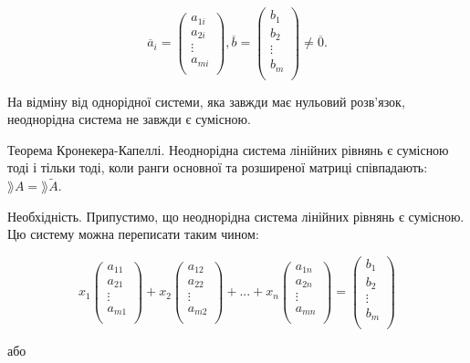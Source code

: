 $$\overline{a}_i = \begin{pmatrix}
	a_{1i} \\
	a_{2i} \\
	\vdots \\
	a_{mi} \\
\end{pmatrix}, \overline{b} = \begin{pmatrix}
	b_{1} \\
	b_{2} \\
	\vdots \\
	b_{m} \\
\end{pmatrix} \neq \overline{0}.$$


На відміну від однорідної системи, яка завжди має нульовий розв’язок,
неоднорідна система не завжди є сумісною.


Теорема Кронекера-Капеллі. Неоднорідна система лінійних рівнянь є
сумісною тоді і тільки тоді, коли ранги основної та розширеної матриці
співпадають: $\rang A = \rang \tilde{A}$.

Необхідність. Припустимо, що неоднорідна система лінійних рівнянь є
сумісною. Цю систему можна переписати таким чином: 

$$x_1 \begin{pmatrix}
	a_{11} \\
	a_{21} \\
	\vdots \\
	a_{m1} \\
\end{pmatrix} + x_2 \begin{pmatrix}
	a_{12} \\
	a_{22} \\
	\vdots \\
	a_{m2} \\
\end{pmatrix} + ... + x_n \begin{pmatrix}
	a_{1n} \\
	a_{2n} \\
	\vdots \\
	a_{mn} \\
\end{pmatrix} = \begin{pmatrix}
	b_{1} \\
	b_{2} \\
	\vdots \\
	b_{m} \\
\end{pmatrix}$$

або


